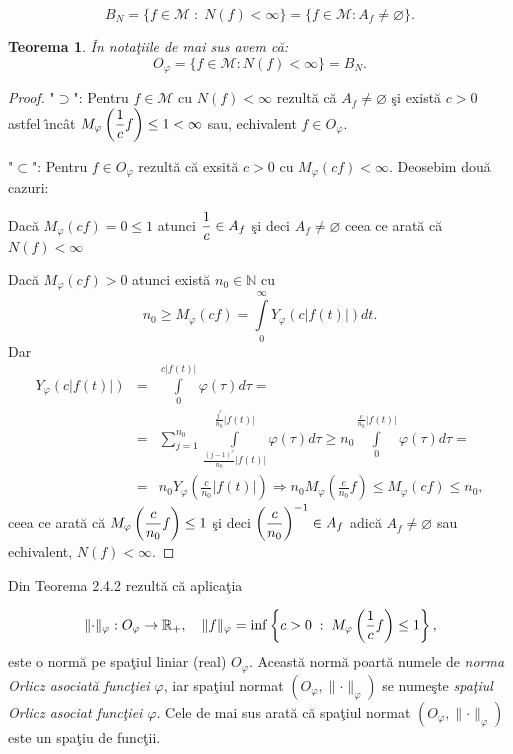 \documentclass[ a4paper, 12pt]{report}
\newtheorem{theorem}{\bf Teorema}[section]
\theoremstyle{definition}
\theoremstyle{remark}
\numberwithin{equation}{section}
\begin{document}
$$B_N = \{ f \in \mathcal{M}\; : \; N(f) < \infty\} = \{f \in \mathcal{M}: A_f \neq \varnothing\}.$$

\begin{theorem} \^ In nota\c tiile de mai sus avem c\u a:
$$O_\varphi =\{ f \in \mathcal{M}: N(f) < \infty\} = B_N.$$
\end{theorem}

\begin{proof}
"$\supset$": Pentru $f \in \mathcal{M}$ cu $N(f) < \infty$ rezult\u a c\u a $A_f \neq \varnothing$ \c si exist\u a $c>0$ astfel \^\i nc\^ at  $M_\varphi \left(\displaystyle\frac{1}{c}f \right) \leq 1 < \infty$ sau, echivalent $f \in O_\varphi$.

"$\subset$": Pentru $f \in O_\varphi$ rezult\u a c\u a exsit\u a $c >0$ cu $M_\varphi (cf) < \infty$. Deosebim dou\u a cazuri:

Dac\u a $M_\varphi (cf) = 0 \leq 1$ atunci $\displaystyle\frac{1}{c} \in A_f$ \c si deci $A_f \neq \varnothing$ ceea ce arat\u a  c\u a $N(f)<\infty$

Dac\u a $M_\varphi (cf) > 0$ atunci exist\u a $n_0 \in \mathbb{N}$ cu
$$n_0\geq M_\varphi (cf) = \int\limits_{0}^{\infty} Y_\varphi (c \lvert f(t) \rvert) dt.$$
Dar
\begin{eqnarray*}
Y_\varphi (c \lvert f(t) \rvert) &=& \int\limits_{0}^{c\lvert f(t) \rvert} \varphi(\tau) d\tau = \\
&=&\sum\limits_{j=1}^{n_0} \int\limits_{\frac{(j-1)^c}{n_0} \lvert f(t) \rvert}^{\frac{j^c}{n_0}\lvert f(t) \rvert} \varphi (\tau) d\tau \geq n_0 \int\limits_{0}^{\frac{c}{n_0} \lvert f(t) \rvert}  \varphi(\tau) d\tau = \\
&=& n_0 Y_\varphi\left (\frac{c}{n_0}\lvert f(t) \rvert \right) \Rightarrow n_0 M_\varphi \left (\frac{c}{n_0}f \right ) \leq M_\varphi (cf) \leq n_0,
 \end{eqnarray*}
ceea ce arat\u a c\u a $M_\varphi \left(\displaystyle\frac{c}{n_0}f \right ) \leq 1$ \c si deci ${\left(\displaystyle\frac{c}{n_0}\right)}^{-1} \in A_f$ adic\u a $A_f \neq \varnothing$ sau echivalent, $N(f) < \infty$.
\end{proof}

\smallskip

Din Teorema 2.4.2 rezult\u a c\u a aplica\c tia

$$\lVert \cdot \rVert _\varphi : O_\varphi \to \mathbb{R}_+, \quad \lVert f \rVert _\varphi = \inf \left\{ c > 0 \; : \; M_\varphi \left(\displaystyle\frac{1}{c}f \right)\leq 1 \right\},$$
este o norm\u a pe spa\c tiul liniar (real) $O_\varphi$. Aceast\u a norm\u a poart\u a numele de {\it norma Orlicz asociat\u a func\c tiei $\varphi$}, iar spa\c tiul normat $(O_\varphi, \lVert \cdot \rVert_\varphi)$ se nume\c ste {\it spa\c tiul Orlicz asociat func\c tiei $\varphi$}. Cele de mai sus arat\u a c\u a spa\c tiul normat $(O_\varphi, \lVert \cdot \rVert_\varphi)$ este un spa\c tiu de func\c tii.
\end{document}
